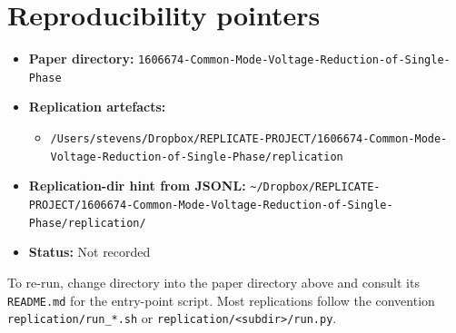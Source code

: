 \documentclass[11pt]{article}
\begin{document}
\section{Reproducibility pointers}\label{sec:repro}
\begin{itemize}
\item \textbf{Paper directory:} \texttt{1606674-Common-Mode-Voltage-Reduction-of-Single-Phase}
\item \textbf{Replication artefacts:}
\begin{itemize}
\item \texttt{/Users/stevens/Dropbox/REPLICATE-PROJECT/1606674-Common-Mode-Voltage-Reduction-of-Single-Phase/replication}
\end{itemize}
\item \textbf{Replication-dir hint from JSONL:} \texttt{\textasciitilde{}/Dropbox/REPLICATE-PROJECT/1606674-Common-Mode-Voltage-Reduction-of-Single-Phase/replication/}
\item \textbf{Status:} Not recorded
\end{itemize}

To re-run, change directory into the paper directory above and consult its \texttt{README.md} for the entry-point script. Most replications follow the convention \texttt{replication/run\_*.sh} or \texttt{replication/<subdir>/run.py}.
\end{document}
